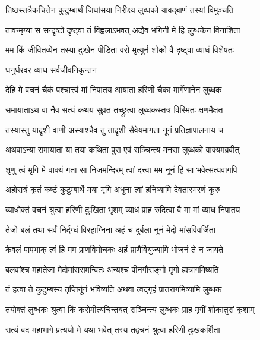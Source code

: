 \twolineshloka
{तिष्ठस्तत्रैकचित्तेन कुटुम्बार्थं जिघांसया}
{निरीक्ष्य लुब्धको यावद्बाणं तस्यां विमुञ्चति}%

\twolineshloka
{तावन्मृग्या स सन्दृष्टो दृष्ट्वा तं विह्वलाऽभवत्}
{अद्यैव भगिनी मे हि लुब्धकेन विनाशिता}%

\twolineshloka
{मम किं जीवितव्येन तस्या दुःखेन पीडिता}
{वरो मृत्युर्न शोको वै दृष्ट्वा व्याधं विशेषतः}%



\onelineshloka
{धनुर्धरवर व्याध सर्वजीवनिकृन्तन}%

\twolineshloka
{देहि मे वचनं चैकं पश्चात्त्वं मां निपातय}
{आयाता हरिणी चैका मार्गेणानेन लुब्धक}%

\twolineshloka
{समायाताऽथ वा नैव सत्यं कथय सुव्रत}
{तच्छ्रुत्वा लुब्धकस्तत्र विस्मितः क्षणमैक्षत}%

\twolineshloka
{तस्यास्तु यादृशी वाणी अस्याश्चैव तु तादृशी}
{सैवेयमागता नूनं प्रतिज्ञापालनाय च}%

\twolineshloka
{अथवाऽन्या समायाता या तया कथिता पुरा}
{एवं सञ्चिन्त्य मनसा लुब्धको वाक्यमब्रवीत्}%


\twolineshloka
{शृणु त्वं मृगि मे वाक्यं गता सा निजमन्दिरम्}
{त्वां दत्त्वा मम नूनं हि सा भवेत्सत्यवागपि}%

\twolineshloka
{अहोरात्रं कृतं कष्टं कुटुम्बार्थे मया मृगि}
{अधुना त्वां हनिष्यामि देवतास्मरणं कुरु}%

\twolineshloka
{व्याधोक्तं वचनं श्रुत्वा हरिणी दुःखिता भृशम्}
{व्याधं प्राह रुदित्वा वै मा मां व्याध निपातय}%

\twolineshloka
{तेजो बलं तथा सर्वं निर्दग्धं विरहाग्निना}
{अहं च दुर्बला नूनं मेदो मांसविवर्जिता}%

\twolineshloka
{केवलं पापभाक् त्वं हि मम प्राणविमोचकः}
{अहं प्राणैर्वियुज्यामि भोजनं ते न जायते}%

\twolineshloka
{बलवांश्च महातेजा मेदोमांससमन्वितः}
{अन्यश्च पीनगौराङ्गो मृगो ह्यत्रागमिष्यति}%

\twolineshloka
{तं हत्वा ते कुटुम्बस्य तृप्तिर्नूनं भविष्यति}
{अथवा त्वद्गृहं प्रातरागमिष्यामि लुब्धक}

\twolineshloka
{तयोक्तं लुब्धकः श्रुत्वा किं करोमीत्यचिन्तयत्}
{सञ्चिन्त्य लुब्धकः प्राह मृगीं शोकातुरां कृशाम्}%

\twolineshloka
{सत्यं वद महाभागे प्रत्ययो मे यथा भवेत्}
{तस्य तद्वचनं श्रुत्वा हरिणी दुःखकर्शिता}%

